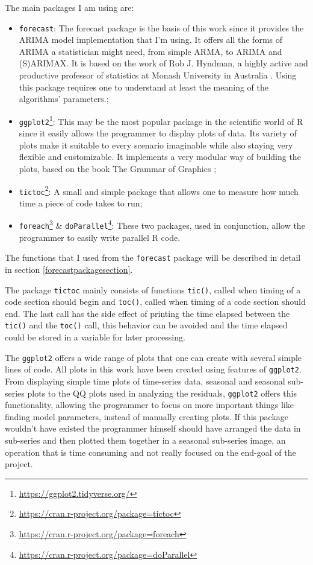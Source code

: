 \documentclass[12pt,a4paper,titlepage]{report}
\begin{document}
The main packages I am using are: 
\begin{itemize}
    \item \texttt{forecast}: The forecast package is the basis of this work since it provides the ARIMA model implementation that I'm using. It offers all the forms of ARIMA a statistician might need, from simple ARMA, to ARIMA and (S)ARIMAX. It is based on the work of Rob J. Hyndman, a highly active and productive professor of statistics at Monash University in Australia \cite{forecastpackagearticle} \cite{forecastpackagemanual}. Using this package requires one to understand at least the meaning of the algorithms' parameters.;
    \item \texttt{ggplot2}\footnote{\url{https://ggplot2.tidyverse.org/}}: This may be the most popular package in the scientific world of R since it easily allows the programmer to display plots of data. Its variety of plots make it suitable to every scenario imaginable while also staying very flexible and customizable. It implements a very modular way of building the plots, based on the book The Grammar of Graphics \cite{thegrammarofgraphics};
    \item \texttt{tictoc}\footnote{\url{https://cran.r-project.org/package=tictoc}}: A small and simple package that allows one to measure how much time a piece of code takes to run;
    \item \texttt{foreach}\footnote{\url{https://cran.r-project.org/package=foreach}} \& \texttt{doParallel}\footnote{\url{https://cran.r-project.org/package=doParallel}}: These two packages, used in conjunction, allow the programmer to easily write parallel R code.
\end{itemize}

The functions that I used from the \texttt{forecast} package will be described in detail in section \ref{forecastpackagesection}.

The package \texttt{tictoc} mainly consists of functions \texttt{tic()}, called when timing of a code section should begin and \texttt{toc()}, called when timing of a code section should end. The last call has the side effect of printing the time elapsed between the \texttt{tic()} and the \texttt{toc()} call, this behavior can be avoided and the time elapsed could be stored in a variable for later processing.

The \texttt{ggplot2} offers a wide range of plots that one can create with several simple lines of code. All plots in this work have been created using features of \texttt{ggplot2}. From displaying simple time plots of time-series data, seasonal and seasonal sub-series plots to the QQ plots used in analyzing the residuals, \texttt{ggplot2} offers this functionality, allowing the programmer to focus on more important things like finding model parameters, instead of manually creating plots. If this package wouldn't have existed the programmer himself should have arranged the data in sub-series and then plotted them together in a seasonal sub-series image, an operation that is time consuming and not really focused on the end-goal of the project.
\end{document}
